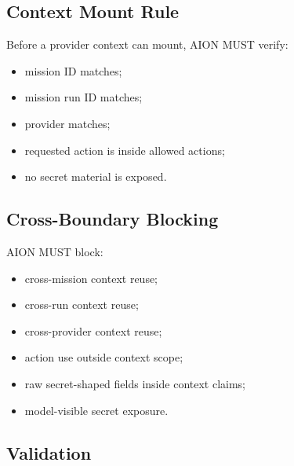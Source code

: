 \subsection{Context Mount Rule}

Before a provider context can mount, AION MUST verify:

\begin{itemize}
  \item mission ID matches;
  \item mission run ID matches;
  \item provider matches;
  \item requested action is inside allowed actions;
  \item no secret material is exposed.
\end{itemize}

\subsection{Cross-Boundary Blocking}

AION MUST block:

\begin{itemize}
  \item cross-mission context reuse;
  \item cross-run context reuse;
  \item cross-provider context reuse;
  \item action use outside context scope;
  \item raw secret-shaped fields inside context claims;
  \item model-visible secret exposure.
\end{itemize}

\subsection{Validation}


